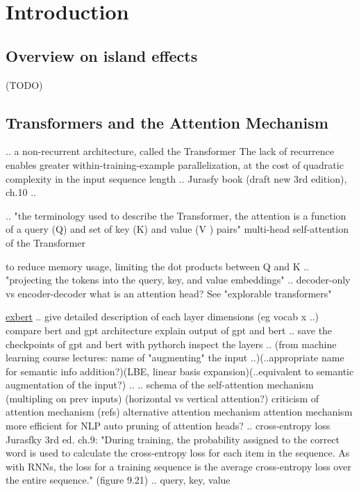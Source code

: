 \chapter{Introduction}

\section{Overview on island effects}
(TODO)

\pagebreak

\section{Transformers and the Attention Mechanism}
..
a non-recurrent architecture, called the Transformer \citep{vaswani2017attention} 
The lack of recurrence enables greater within-training-example parallelization, at the cost of quadratic complexity in the input sequence length  \citep{liu2018generating} 
..
Jurasfy book (draft new 3rd edition), ch.10 ..
\citep[ch.9-10]{jurafsky2021speech} 

..
"the terminology used to describe the Transformer, the attention is a function of a query (Q) and set of key (K) and value (V ) pairs" \citep{liu2018generating} 
multi-head self-attention of the Transformer

to reduce memory usage, limiting the dot products between Q and K
..
"projecting the tokens into the query, key, and value embeddings"
..
decoder-only vs encoder-decoder
what is an attention head? See "explorable transformers" 

\href{https://huggingface.co/exbert/?model=gpt2&modelKind=bidirectional&sentence=The%20girl%20ran%20to%20a%20local%20pub%20to%20escape%20the%20din%20of%20her%20city.&layer=0&heads=..0,1,2,3,4,5,6,7,8,9,10,11&threshold=0.7&tokenInd=null&tokenSide=null&maskInds=..&hideClsSep=true}{exbert}
..
give detailed description of each layer dimensions (eg vocab x ..)
compare bert and gpt architecture
explain output of gpt and bert
..
save the checkpoints of gpt and bert with pythorch inspect the layers
..
(from machine learning course lectures: name of "augmenting" the input ..)(..appropriate name for semantic info addition?)(LBE, linear basis expansion)(..equivalent to semantic augmentation of the input?)
..
..
schema of the self-attention mechanism (multipling on prev inputs)
(horizontal vs vertical attention?)
criticism of attention mechanism (refs)
alternative attention mechanism
attention mechanism more efficient for NLP
auto pruning of attention heads?
..
cross-entropy loss
Jurasfky 3rd ed. ch.9: "During training, the probability assigned to the correct word is used to calculate the cross-entropy loss for each item in the sequence. As with RNNs, the loss for a training sequence is the average cross-entropy loss over the entire sequence." 
(figure 9.21)
..
query, key, value



